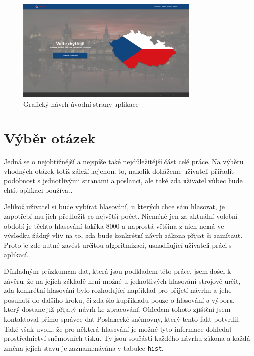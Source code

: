 \begin{figure}
    \centering
    \includegraphics[width=0.8\textwidth]{obrazky-figures/Homepage.pdf}
    \caption{Grafický návrh úvodní strany aplikace}
    \label{fig:graphic-homepage}
\end{figure}



\section{Výběr otázek}
Jedná se o nejobtížnější a nejspíše také nejdůležitější část celé práce. Na výběru vhodných otázek totiž záleží nejenom to, nakolik dokážeme uživateli přiřadit podobnost s jednotlivými stranami a poslanci, ale také zda uživatel vůbec bude chtít aplikaci používat.\\

\par Jelikož uživatel si bude vybírat hlasování, u kterých chce sám hlasovat, je zapotřebí mu jich předložit co největší počet. Nicméně jen za aktuální volební období je těchto hlasování takřka 8000 a naprostá většina z nich nemá ve výsledku žádný vliv na to, zda bude konkrétní návrh zákona přijat či zamítnut. Proto je zde nutné zavést určitou algoritmizaci, usnadňující uživateli práci s aplikací. \\

\par Důkladným průzkumem dat, která jsou podkladem této práce, jsem došel k závěru, že na jejich základě není možné u jednotlivých hlasování strojově určit, zda konkrétní hlasování bylo rozhodující například pro přijetí návrhu a jeho posunutí do dalšího kroku, či zda šlo kupříkladu pouze o hlasování o výboru, který dostane již přijatý návrh ke zpracování. Ohledem tohoto zjištění jsem kontaktoval přímo správce dat Poslanecké sněmovny, který tento fakt potvrdil. Také však uvedl, že pro některá hlasování je možné tyto informace dohledat prostřednictví sněmovních tisků. Ty jsou součástí každého návrhu zákona a každá změna jejich stavu je zaznamenávána v tabulce \texttt{hist}.\\

